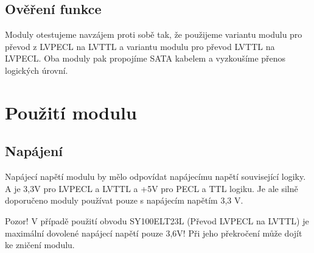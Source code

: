 \documentclass[12pt,a4paper,oneside]{article}
\begin{document}
\subsection{Ověření funkce}

Moduly otestujeme navzájem proti sobě tak, že použijeme variantu modulu pro převod z LVPECL na LVTTL a variantu modulu pro převod LVTTL na LVPECL. Oba moduly pak propojíme SATA kabelem a vyzkoušíme přenos logických úrovní. 


\section{Použití modulu}

\subsection{Napájení}

Napájecí napětí modulu by mělo odpovídat napájecímu napětí související
logiky. A je 3,3V pro LVPECL a LVTTL a +5V pro PECL a TTL logiku. Je ale silně doporučeno moduly používat pouze s napájecím napětím 3,3 V.  

Pozor! V případě použití obvodu SY100ELT23L (Převod LVPECL na LVTTL) je
maximální dovolené napájecí napětí pouze 3,6V! Při jeho překročení může dojít
ke zničení modulu.
\end{document}
